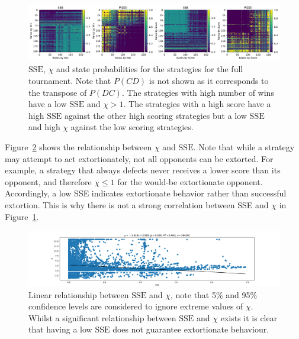 \documentclass[a4paper]{article}
\newcommand{\SSe}{\text{SSE}}
\begin{document}
\begin{figure}[!htbp]
    \centering
    \includegraphics[width=.95\textwidth]{./assets/img/sse_chi_probabilities_in_full/main.pdf}
    \caption{\(\SSe\), \(\chi\) and state probabilities for the strategies for
        the full tournament. Note that \(P(CD)\) is not shown as it corresponds
        to the transpose of \(P(DC)\).  The strategies with high number of wins
        have a low \(\SSe\) and \(\chi>1\). The strategies with a high score
        have a high \(\SSe\) against the other high scoring strategies but a low
        \(\SSe\) and high \(\chi\) against the low scoring strategies.}
    \label{fig:sse_chi_probabilities_in_full}
\end{figure}

Figure~\ref{fig:relationship_between_sse_and_chi} shows the relationship between
\(\chi\) and \(\SSe\). Note that while a strategy may attempt to act
extortionately, not all opponents can be extorted. For example, a strategy
that always defects never receives a lower score than its opponent, and
therefore $\chi \leq 1$ for the would-be extortionate opponent. Accordingly, a low
SSE indicates extortionate behavior rather than successful extortion. This is
why there is not a strong correlation between SSE and $\chi$ in Figure~\ref{fig:sse_chi_probabilities_in_full}.

\begin{figure}[!hbtp]
    \centering
    \includegraphics[width=.95\textwidth]{./assets/img/relationship_between_sse_and_chi/main.pdf}
    \caption{Linear relationship between \(\SSe\) and \(\chi\), note that 5\%
        and 95\% confidence levels are considered to ignore extreme values of
        \(\chi\). Whilst a significant relationship between \(\SSe\) and
        \(\chi\) exists it is clear that having a low \(\SSe\) does not
        guarantee extortionate behaviour.}
    \label{fig:relationship_between_sse_and_chi}
\end{figure}
\end{document}

